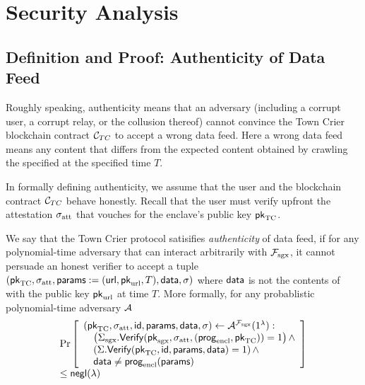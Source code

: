\section{Security Analysis}
\label{sec:analysis}


\subsection{Definition and Proof: Authenticity of Data Feed}
Roughly speaking, authenticity means that 
an adversary (including a corrupt
user, a corrupt relay, or the collusion thereof)
cannot convince   
the Town Crier blockchain contract 
${\cal C}_{TC}$ to accept 
a wrong data feed. 
Here a wrong data feed means any content
that differs from the expected content
obtained by crawling the specified \weburl at 
the specified time $T$.

In formally defining 
authenticity, 
we assume that the user and the blockchain
contract ${\cal C}_{TC}$ behave honestly.
Recall that the user must verify 
upfront the attestation ${\sigma_{\textrm{att}}}$ 
that vouches 
for the enclave's public key ${\sf pk}_{\textrm{TC}}$.


\begin{definition}[Authenticity]
We say that the Town Crier protocol 
satisifies {\it authenticity} of data feed,
if for any polynomial-time adversary
that can interact arbitrarily with $\mathcal{F}_{\textrm{sgx}}$,
it cannot 
persuade an honest verifier to accept
a tuple $({\sf pk}_{\textrm{TC}}, {\sigma_{\textrm{att}}}, {\sf params}:=({{\sf url}}, {\sf pk}_{\textrm{url}}, T), {\sf data}, \sigma)$
where ${\sf data}$ is not 
the contents of 
\weburl with the public key ${\sf pk}_{\textrm{url}}$ at time $T$.
More formally, 
for any probablistic polynomial-time adversary $\mathcal{A}$
\[
\begin{array}{l}
\Pr\left[
\begin{array}{l}
({\sf pk}_{\textrm{TC}}, {\sigma_{\textrm{att}}}, {\sf id}, {\sf params}, {\sf data}, \sigma) \leftarrow 
\mathcal{A}^{\mathcal{F}_{\textrm{sgx}}}(1^\lambda) :\\
\quad \left({\Sigma_{\textrm{sgx}}}.{\sf Verify}({\sf pk}_{\mathrm{sgx}}, {\sigma_{\textrm{att}}}, ({\sf prog}_{\textrm{encl}}, {\sf pk}_{\textrm{TC}})) = 1\right) \wedge \\
\quad \left(\Sigma.{\sf Verify}({\sf pk}_{\textrm{TC}}, {\sf id}, {\sf params}, {\sf data})  = 1\right) \wedge\\
\quad {\sf data} \neq {\sf prog}_{\textrm{encl}}({\sf params}) 
\end{array}
\right] \\[3pt] 
\leq {\sf negl}(\lambda)
\end{array}
\]
\label{defn:auth}
\end{definition}


